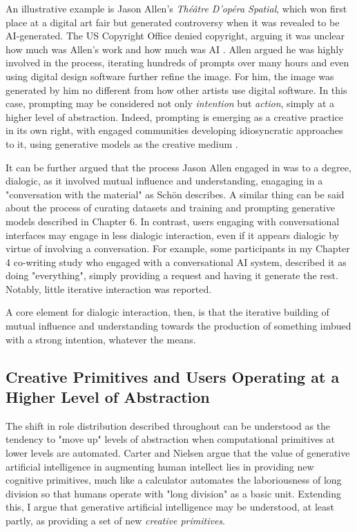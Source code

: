 An illustrative example is Jason Allen's \textit{Théâtre D'opéra Spatial}, which won first place at a digital art fair but generated controversy when it was revealed to be AI-generated. The US Copyright Office denied copyright, arguing it was unclear how much was Allen's work and how much was AI \cite{US-Copyright-Office-Review-Board2023-nw}. Allen argued he was highly involved in the process, iterating hundreds of prompts over many hours and even using digital design software further refine the image. For him, the image was generated by him no different from how other artists use digital software. In this case, prompting may be considered not only \textit{intention} but \textit{action}, simply at a higher level of abstraction.  Indeed, prompting is emerging as a creative practice in its own right, with engaged communities developing idiosyncratic approaches to it, using generative models as the creative medium \cite{Chang2023-tv, Smith2022-dm}.

It can be further argued that the process Jason Allen engaged in was to a degree, dialogic, as it involved mutual influence and understanding, enagaging in a "conversation with the material" as Schön describes. A similar thing can be said about the process of curating datasets and training and prompting generative models described in Chapter 6. In contrast, users engaging with conversational interfaces may engage in less dialogic interaction, even if it appears dialogic by virtue of involving a conversation. For example, some participants in my Chapter 4 co-writing study who engaged with a conversational AI system, described it as doing "everything", simply providing a request and having it generate the rest. Notably, little iterative interaction was reported. 

A core element for dialogic interaction, then, is that the iterative building of mutual influence and understanding towards the production of something imbued with a strong intention, whatever the means. 

\subsection{Creative Primitives and Users Operating at a Higher Level of Abstraction}

The shift in role distribution described throughout can be understood as the tendency to "move up" levels of abstraction when computational primitives at lower levels are automated. Carter and Nielsen \cite{Carter2017-xj} argue that the value of generative artificial intelligence in augmenting human intellect lies in providing new cognitive primitives, much like a calculator automates the laboriousness of long division so that humans operate with "long division" as a basic unit. Extending this, I argue that generative artificial intelligence may be understood, at least partly, as providing a set of new \textit{creative primitives}.

